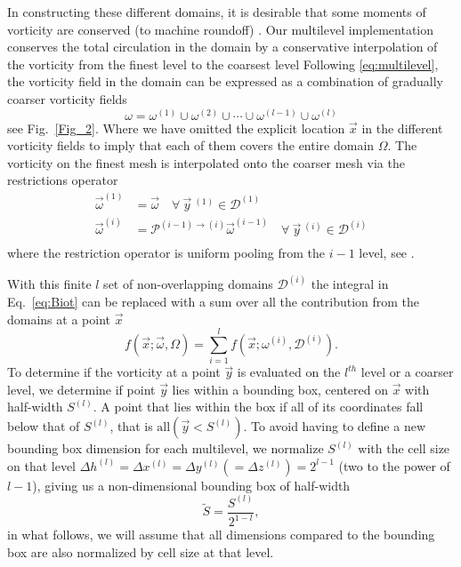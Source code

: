 \documentclass{article}
\begin{document}
In constructing these different domains, it is desirable that some moments of vorticity are conserved (to machine roundoff) \cite{Colonius2008}. Our multilevel implementation conserves the total circulation in the domain by a conservative interpolation of the vorticity from the finest level to the coarsest level
Following \ref{eq:multilevel}, the vorticity field in the domain can be expressed as a combination of gradually coarser vorticity fields
\begin{equation}
    \omega = \omega^{(1)} \cup \omega^{(2)} \cup \cdots \cup \omega^{(l-1)} \cup \omega^{(l)}
\end{equation}
see Fig.~\ref{Fig_2}. Where we have omitted the explicit location $\vec x$ in the different vorticity fields to imply that each of them covers the entire domain $\Omega$. The vorticity on the finest mesh is interpolated onto the coarser mesh via the restrictions operator
\begin{equation}
    \begin{split}
        \vec{\omega}^{(1)} &= \vec{\omega} \quad \forall\ \vec{y}\ ^{(1)} \in \mathcal{D}^{(1)}\\
        \vec{\omega}^{(i)} &= \mathcal{P}^{(i-1)\to(i)}\vec{\omega}^{(i-1)} \quad \forall\  \vec{y}\ ^{(i)} \in \mathcal{D}^{(i)}\\
    \end{split}
\end{equation}
where the restriction operator is uniform pooling from the $i-1$ level, see \cite{Weymouth2022Data-drivenProjection}.

With this finite $l$ set of non-overlapping domains $\mathcal{D}^{(i)}$ the integral in Eq.~\ref{eq:Biot} can be replaced with a sum over all the contribution from the domains at a point $\vec x$
\begin{equation}\label{eq:biot_sum}
    f(\vec{x}; \vec{\omega},\Omega) = \sum_{i=1}^{l} f(\vec{x}; \omega^{(i)},\mathcal{D}^{(i)}).
\end{equation}
To determine if the vorticity at a point $\vec y$ is evaluated on the $l^{th}$ level or a coarser level, we determine if point $\vec y$ lies within a bounding box, centered on $\vec x$ with half-width $S^{(l)}$. A point that lies within the box if all of its coordinates fall below that of $S^{(l)}$, that is $\text{all}(\vec{y}<{S}^{(l)})$. To avoid having to define a new bounding box dimension for each multilevel, we normalize ${S}^{(l)}$ with the cell size on that level $\Delta h^{(l)} = \Delta x^{(l)} = \Delta y^{(l)} (= \Delta z^{(l)}) = 2^{l-1}$ (two to the power of $l-1$), giving us a non-dimensional bounding box of half-width 
\begin{equation}\label{eq:bbox}
    \tilde{S} = \frac{{S}^{(l)}}{2^{1-l}},
\end{equation}
in what follows, we will assume that all dimensions compared to the bounding box are also normalized by cell size at that level.
\end{document}
